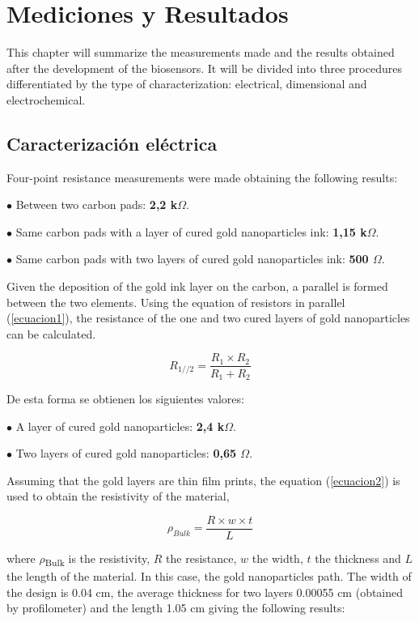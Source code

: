 \chapter{Mediciones y Resultados}
This chapter will summarize the measurements made and the results obtained after the development of the biosensors. It will be divided into three procedures differentiated by the type of characterization: electrical, dimensional and electrochemical.

\section{Caracterización eléctrica}
Four-point resistance measurements were made obtaining the following results:

$\bullet$ Between two carbon pads: \textbf{2,2 k$\Omega$}.

$\bullet$ Same carbon pads with a layer of cured gold nanoparticles ink: \textbf{1,15 k$\Omega$}.

$\bullet$ Same carbon pads with two layers of cured gold nanoparticles ink: \textbf{500 $\Omega$}.

Given the deposition of the gold ink layer on the carbon, a parallel is formed between the two elements. Using the equation of resistors in parallel (\ref{ecuacion1}), the resistance of the one and two cured layers of gold nanoparticles can be calculated.

\begin{equation}\label{ecuacion1}
R_{1//2}=\frac{R_{1} \times R_{2}}{R_{1}+R_{2}}
\end{equation}

De esta forma se obtienen los siguientes valores:

$\bullet$ A layer of cured gold nanoparticles: \textbf{2,4 k$\Omega$}.

$\bullet$ Two layers of cured gold nanoparticles: \textbf{0,65 $\Omega$}.

Assuming that the gold layers are thin film prints, the equation (\ref{ecuacion2}) is used to obtain the resistivity of the material,

\begin{equation}\label{ecuacion2}
\rho_{Bulk}=\frac{R \times w \times t}{L}
\end{equation}

where $\rho$\textsubscript{Bulk} is the resistivity, $R$ the resistance, $w$ the width, $t$ the thickness and $L$ the length of the material. In this case, the gold nanoparticles path. The width of the design is 0.04 cm, the average thickness for two layers 0.00055 cm (obtained by profilometer) and the length 1.05 cm giving the following results:

